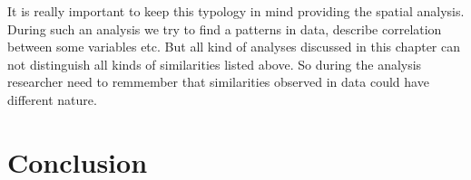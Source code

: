 \documentclass[]{book}
\theoremstyle{definition}
\theoremstyle{definition}
\theoremstyle{definition}
\theoremstyle{remark}
\begin{document}
It is really important to keep this typology in mind providing the
spatial analysis. During such an analysis we try to find a patterns in
data, describe correlation between some variables etc. But all kind of
analyses discussed in this chapter can not distinguish all kinds of
similarities listed above. So during the analysis researcher need to
remmember that similarities observed in data could have different
nature.

\chapter{Conclusion}\label{conclusion}


\end{document}

